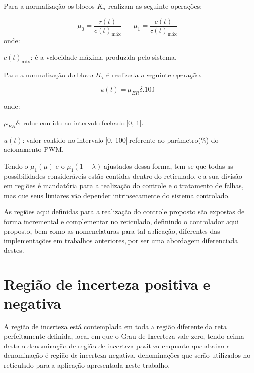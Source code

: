 Para a normalização os blocos $K_n$ realizam as seguinte operações:

\begin{equation}%
\mu_0 = \frac{ r(t)}{c(t)_{\text{máx}}} \ \ \ \ \ \ \ \ \mu_1 = \frac{c(t)}{c(t)_{\text{máx}}}
\label{eq:nomaliza}
\end{equation}%
\vspace{-0.4cm}
onde:

$c(t)_{\text{máx}}$: é a velocidade máxima produzida pelo sistema.


Para a normalização do bloco $K_u$ é realizada a seguinte operação:

\begin{equation}
u(t) = \mu_{ER}\delta . 100
\end{equation}

\vspace{-0.4cm}
onde:

$\mu_{ER}\delta$: valor contido no intervalo fechado [0, 1].

$u(t)$: valor contido no intervalo [0, 100] 
referente ao parâmetro(\%) do acionamento PWM.





Tendo o $\mu_1 (\mu)$ e o $\mu_1 (1-\lambda)$ ajustados dessa forma,
tem-se que todas as possibilidades consideráveis estão contidas dentro do reticulado,
e a sua divisão em regiões é mandatória para a realização do controle e o tratamento de
falhas, mas que seus limiares vão depender intrinsecamente do sistema controlado.

As regiões aqui definidas para a realização do controle proposto
são expostas de forma incremental e complementar no reticulado,
definindo o controlador aqui proposto,
bem como as nomenclaturas para tal aplicação,
diferentes das implementações em trabalhos anteriores,
por ser uma abordagem diferenciada destes.


\section{Região de incerteza positiva e negativa}

A região de incerteza está contemplada em toda a região diferente da
reta perfeitamente definida, local em que o Grau de Incerteza vale zero,
tendo acima desta a denominação de região de incerteza positiva
enquanto que abaixo a denominação é região de incerteza negativa,
denominações que serão utilizados no reticulado para a aplicação
apresentada neste trabalho.


